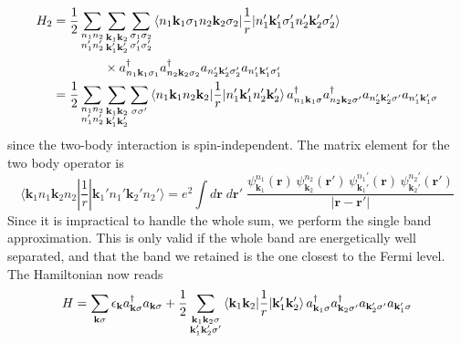 \documentclass[../../../main.tex]{subfiles}
\begin{document}
\begin{align*}
    H_2
     & =   \frac{1}{2}\sum_{\substack{n_1 n_2                                                                                                                             \\ n_1' n_2'}}\sum_{\substack{\mathbf{k}_1 \mathbf{k}_2 \\ \mathbf{k}_1' \mathbf{k}_2'}}\sum_{\substack{\sigma_1 \sigma_2\\\sigma_1' \sigma_2'}}
    \braket{n_1 \mathbf{k}_1 \sigma_1  n_2 \mathbf{k}_2\sigma_2  | \frac{1}{r} |  n_1' \mathbf{k}_1' \sigma_1' n_2'\mathbf{k}_2' \sigma_2'}                               \\
     & \qquad\qquad\times a^\dagger_{n_1\mathbf{k}_1  \sigma_1} a^\dagger_{n_2 \mathbf{k}_2  \sigma_2} a_{ n_2'\mathbf{k}_2'  \sigma_2'}a_{n_1' \mathbf{k}_1'  \sigma_1'} \\
     & =   \frac{1}{2}\sum_{\substack{n_1 n_2                                                                                                                             \\ n_1' n_2'}}\sum_{\substack{\mathbf{k}_1 \mathbf{k}_2 \\ \mathbf{k}_1' \mathbf{k}_2'}}\sum_{\sigma\sigma'}
    \braket{n_1 \mathbf{k}_1  n_2 \mathbf{k}_2  | \frac{1}{r} |  n_1' \mathbf{k}_1' n_2'\mathbf{k}_2'   }
    a^\dagger_{n_1\mathbf{k}_1  \sigma} a^\dagger_{n_2 \mathbf{k}_2  \sigma'} a_{ n_2'\mathbf{k}_2'  \sigma'}a_{n_1' \mathbf{k}_1'  \sigma}
\end{align*}
since the two-body interaction is spin-independent.
The matrix element for the two body operator is
\begin{equation*}
    \langle \mathbf{k}_1 n_1 \mathbf{k}_2 n_2|\frac{1}{r}|\mathbf{k}_1' n_1' \mathbf{k}_2' n_2'\rangle = e^2 \int d\mathbf r\;d\mathbf r'\;
    \frac{\psi_{\mathbf{k}_1}^{n_1}(\mathbf r)\,\psi_{\mathbf{k}_2}^{n_2}(\mathbf r')\,\psi_{\mathbf{k}_1'}^{n_1'}(\mathbf r)\,\psi_{\mathbf{k}_2'}^{n_2'}(\mathbf r')}
    {|\mathbf r-\mathbf r'|}
\end{equation*}
Since it is impractical to handle the whole sum, we perform the single band approximation.
This is only valid if the whole band are energetically well separated, and that the band we retained is the one closest to the Fermi level.
The Hamiltonian now reads
\begin{equation*}
    H =\sum_{\mathbf{k}  \sigma} \epsilon_{\mathbf{k }}  a^\dagger_{\mathbf{k}  \sigma} a_{ \mathbf{k} \sigma}
    +\frac{1}{2}\sum_{\substack{\mathbf{k}_1 \mathbf{k}_2 \sigma \\ \mathbf{k}_1' \mathbf{k}_2' \sigma'}}
    \braket{ \mathbf{k}_1   \mathbf{k}_2  | \frac{1}{r} |   \mathbf{k}_1' \mathbf{k}_2'   }
    a^\dagger_{ \mathbf{k}_1  \sigma} a^\dagger_{  \mathbf{k}_2  \sigma'} a_{\mathbf{k}_2'  \sigma'}a_{  \mathbf{k}_1'  \sigma}
\end{equation*}
\end{document}
